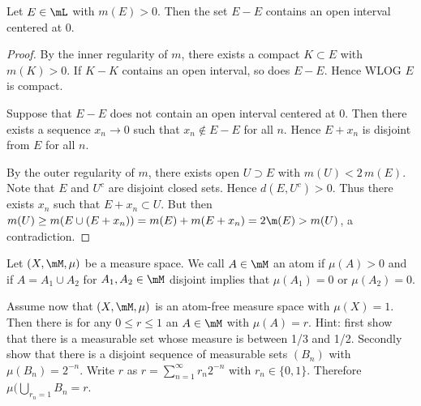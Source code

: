 \documentclass{article}
\begin{document}
 Let $E \in \mL$ with $m(E) > 0$. Then the set $E - E$ contains an open interval centered at 0.
\begin{proof}
By the inner regularity of $m$, there exists a compact $K \subset E$ with $m(K) > 0$. If $K - K$ contains an open interval, so does $E - E$. Hence WLOG $E$ is compact.

Suppose that $E - E$ does not contain an open interval centered at 0. Then there exists a sequence $x_n \to 0$ such that $x_n \not\in E - E$ for all $n$.  Hence $E + x_n$ is disjoint from $E$ for all $n$.

By the outer regularity of $m$, there exists open $U \supset E$ with $m(U) < 2 \,m(E)$.  Note that $E$ and $U^c$ are disjoint closed sets. Hence $d(E, U^c) > 0$.  Thus there exists $x_n$ such that $E + x_n \subset U$.  But then $m(U) \ge m(E \cup (E + x_n)) = m(E) + m(E + x_n) = 2 \m(E) > m(U)$, a contradiction.
\end{proof}

 Let $(X , \mM, \mu)$ be a measure space. We call $A \in \mM$ an atom if $\mu(A) > 0$ and if $A = A_1 \cup A_2$ for $A_1, A_2 \in \mM$ disjoint implies that $\mu(A_1) = 0$ or $\mu(A_2) = 0$.

Assume now that $(X, \mM, \mu)$ is an atom-free measure space with $\mu(X) = 1$. Then there is for any $0 \le r \le 1$ an $A \in \mM$ with $\mu(A) = r$. Hint: first show that there is a measurable set whose measure is between 1/3 and 1/2. Secondly show that there is a disjoint sequence of measurable sets $(B_n)$ with $\mu(B_n) = 2^{-n}$. Write $r$ as $r = \sum_{n=1}^\infty r_n2^{-n}$ with $r_n \in \{0, 1\}$.  Therefore $\mu(\bigcup_{r_n=1} B_n = r$.
\end{document}
